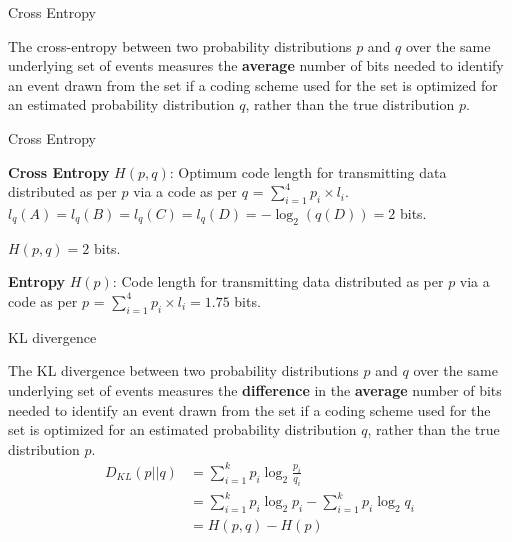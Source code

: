 \documentclass[handout]{beamer}
\begin{document}
    \begin{frame}{Cross Entropy}
        \begin{tcolorbox}[colback=metropolisblue!5,colframe=metropolisblue,title={Cross Entropy $H(p,q)$}]
            The cross-entropy between two probability distributions $p$ and $q$ over the same underlying set of events measures the \textbf{average} number of bits needed to identify an event drawn from the set if a coding scheme used for the set is optimized for an estimated probability distribution $q$, rather than the true distribution $p$.
        \end{tcolorbox}


    \end{frame}

    \begin{frame}{Cross Entropy}

        \textbf{Cross Entropy} $H(p, q)$: Optimum code length for transmitting data distributed as per $p$ via a code as per $q$ = $\sum_{i=1}^4 p_i \times l_i$. $l_q(A) = l_q(B) = l_q(C) = l_q(D) = -\log_2(q(D)) = 2$ bits. 
        
        $H(p, q) = 2$ bits.

        \textbf{Entropy} $H(p)$: Code length for transmitting data distributed as per $p$ via a code as per $p$ = $\sum_{i=1}^4 p_i \times l_i  = 1.75$ bits.


    \end{frame}
        
    \begin{frame}{KL divergence}
        \begin{tcolorbox}[colback=metropolisblue!5,colframe=metropolisblue,title={KL Divergence $D_{KL}(p||q)$}]
            The KL divergence between two probability distributions $p$ and $q$ over the same underlying set of events measures the \textbf{difference} in the \textbf{average} number of bits needed to identify an event drawn from the set if a coding scheme used for the set is optimized for an estimated probability distribution $q$, rather than the true distribution $p$.
            \begin{align*}
                D_{KL}(p||q) &= \sum_{i=1}^k p_i \log_2\frac{p_i}{q_i} \\
                &= \sum_{i=1}^k p_i \log_2 p_i - \sum_{i=1}^k p_i \log_2 q_i \\
                &= H(p, q) - H(p)
            \end{align*}
        \end{tcolorbox}
    
    \end{frame}
\end{document}
